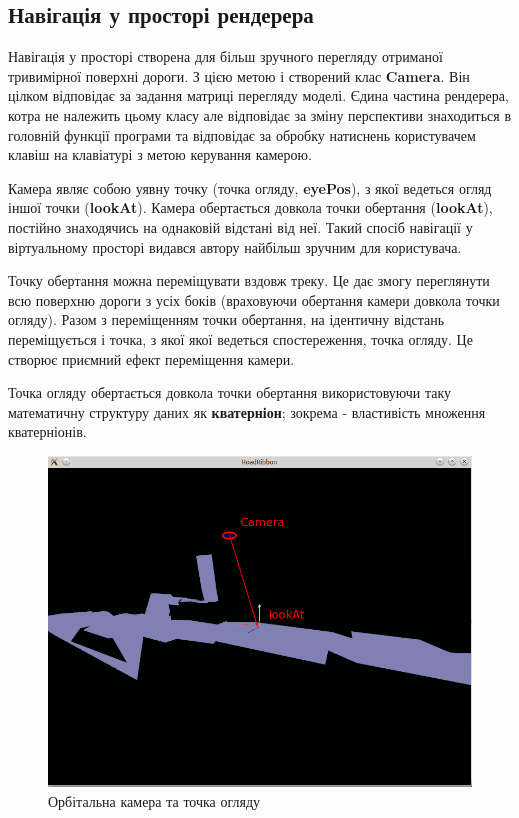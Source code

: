 \documentclass[simple,a4paper,14pt,ukrainian,utf8]{eskdtext}
\begin{document}
	\subsection{Навігація у просторі рендерера}
	
		Навігація у просторі створена для більш зручного перегляду отриманої тривимірної поверхні дороги. З цією метою і створений клас \textbf{Camera}. Він цілком відповідає за задання матриці перегляду моделі. Єдина частина рендерера, котра не належить цьому класу але відповідає за зміну перспективи знаходиться в головній функції програми та відповідає за обробку натиснень користувачем клавіш на клавіатурі з метою керування камерою.
		
		Камера являє собою уявну точку (точка огляду, \textbf{eyePos}), з якої ведеться огляд іншої точки (\textbf{lookAt}). Камера обертається довкола точки обертання (\textbf{lookAt}), постійно знаходячись на однаковій відстані від неї. Такий спосіб навігації у віртуальному просторі видався автору найбільш зручним для користувача.
		
		Точку обертання можна переміщувати вздовж треку. Це дає змогу переглянути всю поверхню дороги з усіх боків (враховуючи обертання камери довкола точки огляду). Разом з переміщенням точки обертання, на ідентичну відстань переміщується і точка, з якої якої ведеться спостереження, точка огляду. Це створює приємний ефект переміщення камери.
		
		Точка огляду обертається довкола точки обертання використовуючи таку математичну структуру даних як \textbf{кватерніон}; зокрема - властивість множення кватерніонів.
		
		\vspace{3em}
		\begin{figure}
			\centering \includegraphics[scale=0.5]{images/camera2.png}
			\caption{Орбітальна камера та точка огляду}
		\end{figure}
       
\end{document}
